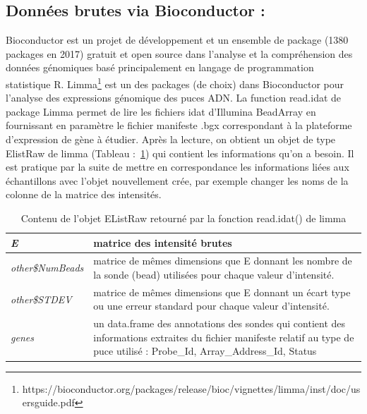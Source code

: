 \documentclass[a4paper,10pt]{article}
\begin{document}
\subsection{ Données brutes via Bioconductor :}
Bioconductor est un projet de développement et un ensemble de package (1380 packages en 2017)  gratuit et open source dans l’analyse et la compréhension des données génomiques basé principalement en langage de programmation statistique R.
Limma\footnote{https://bioconductor.org/packages/release/bioc/vignettes/limma/inst/doc/usersguide.pdf} est un des packages (de choix) dans Bioconductor pour l’analyse des expressions génomique des puces  ADN. La function read.idat de package Limma permet de lire les fichiers idat d’Illumina BeadArray en fournissant en paramètre le fichier manifeste .bgx correspondant à la plateforme d’expression de gène à étudier.
Après la lecture, on obtient un objet de type ElistRaw de limma (Tableau :~\ref{EListRaw}) qui contient les informations qu’on a besoin. 
Il est pratique par la suite de mettre en correspondance les informations liées aux échantillons avec l’objet nouvellement crée, par exemple changer les noms de la colonne de la matrice des intensités.
\begin{table}[!ht]
\begin{tabular}{|p{3cm}|p{9cm}|}
\hline
 \emph{E} & matrice des intensité brutes\\
\hline
\emph{other\$NumBeads }   &  matrice de mêmes dimensions que E donnant les nombre de la sonde (bead) utilisées pour chaque valeur d'intensité. \\
\hline 
\emph{other\$STDEV} & matrice de mêmes dimensions que E donnant un écart type ou une erreur standard pour chaque valeur d'intensité.\\
\hline
\emph{genes} & un data.frame des annotations des sondes qui contient des informations extraites du fichier manifeste relatif au type de puce utilisé : Probe\_Id, Array\_Address\_Id, Status
\\
\hline
\end{tabular}
\caption{Contenu de l'objet EListRaw retourné par la fonction read.idat() de limma}
\label{EListRaw}
\end{table}
\end{document}
